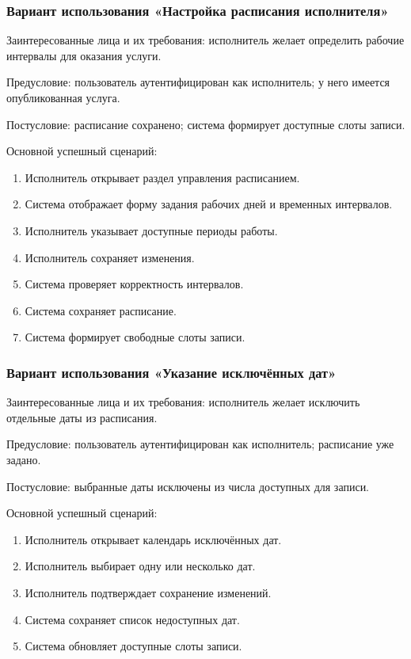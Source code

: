 \subsubsection{Вариант использования «Настройка расписания исполнителя»}

Заинтересованные лица и их требования: исполнитель желает определить рабочие интервалы для оказания услуги.

Предусловие: пользователь аутентифицирован как исполнитель; у него имеется опубликованная услуга.

Постусловие: расписание сохранено; система формирует доступные слоты записи.

Основной успешный сценарий:
\begin{enumerate}
	\item Исполнитель открывает раздел управления расписанием.
	\item Система отображает форму задания рабочих дней и временных интервалов.
	\item Исполнитель указывает доступные периоды работы.
	\item Исполнитель сохраняет изменения.
	\item Система проверяет корректность интервалов.
	\item Система сохраняет расписание.
	\item Система формирует свободные слоты записи.
\end{enumerate}

\subsubsection{Вариант использования «Указание исключённых дат»}

Заинтересованные лица и их требования: исполнитель желает исключить отдельные даты из расписания.

Предусловие: пользователь аутентифицирован как исполнитель; расписание уже задано.

Постусловие: выбранные даты исключены из числа доступных для записи.

Основной успешный сценарий:
\begin{enumerate}
	\item Исполнитель открывает календарь исключённых дат.
	\item Исполнитель выбирает одну или несколько дат.
	\item Исполнитель подтверждает сохранение изменений.
	\item Система сохраняет список недоступных дат.
	\item Система обновляет доступные слоты записи.
\end{enumerate}

